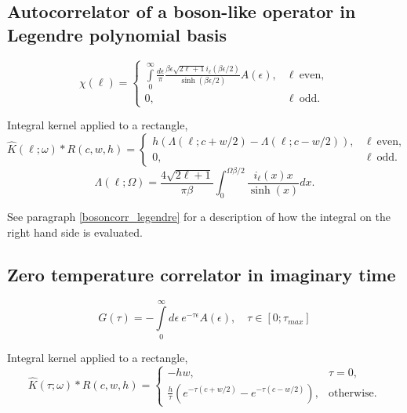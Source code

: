\documentclass[]{article}
\begin{document}
\subsection{Autocorrelator of a boson-like operator in Legendre polynomial basis}
\label{bosonautocorr_legendre}
\begin{equation}
	\chi(\ell) = \left\{
		\begin{array}{ll}
		\int\limits_0^\infty
		\frac{d\epsilon}{\pi}
		\frac{\beta\epsilon\sqrt{2\ell+1} i_{\ell}(\beta\epsilon/2)}
		{\sinh(\beta\epsilon/2)} A(\epsilon), &\ell\ \mathrm{ even},\\
		0, &\ell\ \mathrm{odd}.
	\end{array}\right.
\end{equation}

Integral kernel applied to a rectangle,
\begin{equation}
	\hat K(\ell;\omega)*R(c,w,h) = \left\{
	\begin{array}{ll}
	h(\Lambda(\ell;c+w/2)-\Lambda(\ell;c-w/2)), &\ell\ \mathrm{ even},\\
	0, &\ell\ \mathrm{odd}.
	\end{array}\right.
\end{equation}
\begin{equation}
	\Lambda(\ell;\Omega) =
	\frac{4\sqrt{2\ell+1}}{\pi\beta}
	\int_0^{\Omega\beta/2} \frac{i_\ell(x) x}{\sinh(x)} dx.
\end{equation}

See paragraph \ref{bosoncorr_legendre} for a description of how the integral on
the right hand side is evaluated.

\subsection{Zero temperature correlator in imaginary time}
\label{zerotemp_imtime}
\begin{equation}
	G(\tau) = -\int\limits_0^\infty
	d\epsilon\ e^{-\tau\epsilon} A(\epsilon), \quad
	\tau\in[0;\tau_{max}]
\end{equation}

Integral kernel applied to a rectangle,
\begin{equation}
	\hat K(\tau;\omega)*R(c,w,h) =  \left\{
	\begin{array}{ll}
		-hw, &\tau=0,\\
		\frac{h}{\tau}(e^{-\tau(c+w/2)}-e^{-\tau(c-w/2)}) ,&\mathrm{otherwise}.
	\end{array}\right.
\end{equation}
\end{document}
